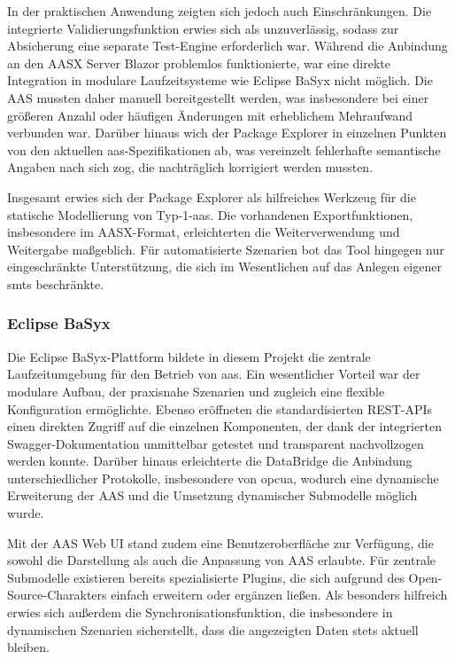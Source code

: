 In der praktischen Anwendung zeigten sich jedoch auch Einschränkungen.
Die integrierte Validierungsfunktion erwies sich als unzuverlässig, sodass zur Absicherung eine separate Test-Engine erforderlich war.
Während die Anbindung an den AASX Server Blazor problemlos funktionierte, war eine direkte Integration in modulare Laufzeitsysteme wie Eclipse BaSyx nicht möglich.
Die AAS mussten daher manuell bereitgestellt werden, was insbesondere bei einer größeren Anzahl oder häufigen Änderungen mit erheblichem Mehraufwand verbunden war.
Darüber hinaus wich der Package Explorer in einzelnen Punkten von den aktuellen \acs{aas}-Spezifikationen ab, was vereinzelt fehlerhafte semantische Angaben nach sich zog, die nachträglich korrigiert werden mussten.

Insgesamt erwies sich der Package Explorer als hilfreiches Werkzeug für die statische Modellierung von Typ-1-\acs{aas}.
Die vorhandenen Exportfunktionen, insbesondere im AASX-Format, erleichterten die Weiterverwendung und Weitergabe maßgeblich.
Für automatisierte Szenarien bot das Tool hingegen nur eingeschränkte Unterstützung, die sich im Wesentlichen auf das Anlegen eigener \acsp{smt} beschränkte.

\newpage
\subsubsection{Eclipse BaSyx}

Die Eclipse BaSyx-Plattform bildete in diesem Projekt die zentrale Laufzeitumgebung für den Betrieb von \acs{aas}.
Ein wesentlicher Vorteil war der modulare Aufbau, der praxisnahe Szenarien und zugleich eine flexible Konfiguration ermöglichte.
Ebenso eröffneten die standardisierten REST-APIs einen direkten Zugriff auf die einzelnen Komponenten, der dank der integrierten Swagger-Dokumentation unmittelbar getestet und transparent nachvollzogen werden konnte.
Darüber hinaus erleichterte die DataBridge die Anbindung unterschiedlicher Protokolle, insbesondere von \acs{opcua}, wodurch eine dynamische Erweiterung der AAS und die Umsetzung dynamischer Submodelle möglich wurde.

Mit der AAS Web UI stand zudem eine Benutzeroberfläche zur Verfügung, die sowohl die Darstellung als auch die Anpassung von AAS erlaubte. 
Für zentrale Submodelle existieren bereits spezialisierte Plugins, die sich aufgrund des Open-Source-Charakters einfach erweitern oder ergänzen ließen.
Als besonders hilfreich erwies sich außerdem die Synchronisationsfunktion, die insbesondere in dynamischen Szenarien sicherstellt, dass die angezeigten Daten stets aktuell bleiben.

